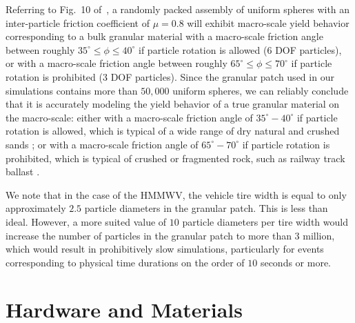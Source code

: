 \documentclass[12pt,onecolumn]{report}
\begin{document}
Referring to Fig.~10 of~\cite{fleischmannetalGEGE2014}, a randomly packed assembly of uniform spheres with an inter-particle friction coefficient of $\mu = 0.8$ will exhibit macro-scale yield behavior corresponding to a bulk granular material with a macro-scale friction angle between roughly $35^\circ \leq \phi \leq 40^\circ$ if particle rotation is allowed (6 DOF particles), or with a macro-scale friction angle between roughly $65^\circ \leq \phi \leq 70^\circ$ if particle rotation is prohibited (3 DOF particles).
%
Since the granular patch used in our simulations contains more than $50,000$ uniform spheres, we can reliably conclude that it is accurately modeling the yield behavior of a true granular material on the macro-scale: either with a macro-scale friction angle of $35^\circ-40^\circ$ if particle rotation is allowed, which is typical of a wide range of dry natural and crushed sands \cite{Cho&Dodds&Santamarina2006}; or with a macro-scale friction angle of $65^\circ-70^\circ$ if particle rotation is prohibited, which is typical of crushed or fragmented rock, such as railway track ballast \cite{Indraratnaetal1998}.

We note that in the case of the HMMWV, the vehicle tire width is equal to only approximately $2.5$ particle diameters in the granular patch.  This is less than ideal.  However, a more suited value of $10$ particle diameters per tire width would increase the number of particles in the granular patch to more than $3$ million, which would result in prohibitively slow simulations, particularly for events corresponding to physical time durations on the order of $10$ seconds or more.

\section{Hardware and Materials}\label{s:Hardware}
\end{document}
